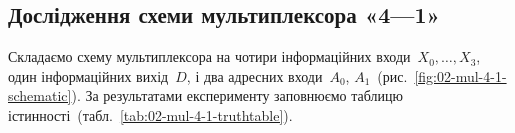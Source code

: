 \documentclass[a4paper,oneside,DIV=12,12pt,headings=normal]{scrartcl}
\begin{document}
			\begin{figure}[!htbp]
				\begin{floatrow}
				\end{floatrow}
			\end{figure}
			
		\subsection{Дослідження схеми мультиплексора «4—1»}
			Складаємо схему мультиплексора на чотири інформаційних входи~$X_0, \dots, X_3$, один інформаційних вихід~$D$, і два адресних входи~$A_0$, $A_1$~(рис.~\ref{fig:02-mul-4-1-schematic}). За результатами експерименту заповнюємо таблицю істинності~(табл.~\ref{tab:02-mul-4-1-truthtable}).
			
\end{document}

